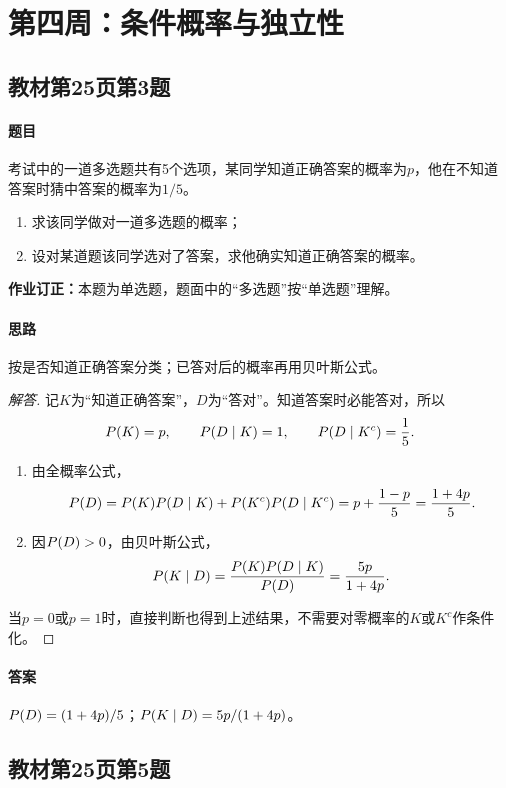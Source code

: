 \section{第四周：条件概率与独立性}

\subsection{教材第25页第3题}
\label{ex:w04-t25-3}
\paragraph{题目}
考试中的一道多选题共有5个选项，某同学知道正确答案的概率为$p$，他在不知道答案时猜中答案的概率为$1/5$。
\begin{enumerate}
\item 求该同学做对一道多选题的概率；
\item 设对某道题该同学选对了答案，求他确实知道正确答案的概率。
\end{enumerate}
\textbf{作业订正：}本题为单选题，题面中的“多选题”按“单选题”理解。
\paragraph{思路}按是否知道正确答案分类；已答对后的概率再用贝叶斯公式。
\begin{proof}[解答]
记$K$为“知道正确答案”，$D$为“答对”。知道答案时必能答对，所以
\[
\P(K)=p,\qquad \P(D\mid K)=1,\qquad \P(D\mid K^c)=\frac15.
\]
\begin{enumerate}
\item 由全概率公式，
\[
\P(D)=\P(K)\P(D\mid K)+\P(K^c)\P(D\mid K^c)
=p+\frac{1-p}{5}=\frac{1+4p}{5}.
\]
\item 因$\P(D)>0$，由贝叶斯公式，
\[
\P(K\mid D)=\frac{\P(K)\P(D\mid K)}{\P(D)}=\frac{5p}{1+4p}.
\]
\end{enumerate}
当$p=0$或$p=1$时，直接判断也得到上述结果，不需要对零概率的$K$或$K^c$作条件化。
\end{proof}
\paragraph{答案}$\P(D)=(1+4p)/5$；$\P(K\mid D)=5p/(1+4p)$。

\subsection{教材第25页第5题}
\label{ex:w04-t25-5}
